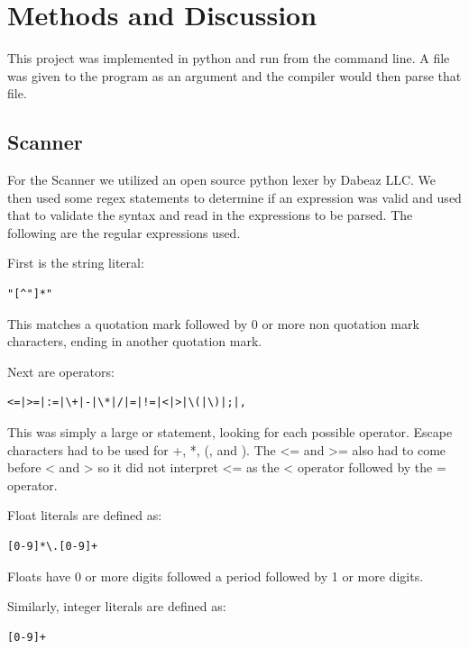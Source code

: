 \documentclass[12pt]{article}
\begin{document}
    \section{Methods and Discussion}
    
                This project was implemented in python and run from the command line.  A file was given to the program as an argument and the compiler would then parse that file.
    
        \subsection{Scanner}
                For the Scanner we utilized an open source python lexer by Dabeaz LLC.  We then used some regex statements to determine if an expression was valid and used that to validate the syntax and read in the expressions to be parsed. The following are the regular expressions used.

                First is the string literal:

                \begin{verbatim}
"[^"]*"
                \end{verbatim}

                This matches a quotation mark followed by 0 or more non quotation mark characters, ending in another quotation mark.

                Next are operators:

                \begin{verbatim}
<=|>=|:=|\+|-|\*|/|=|!=|<|>|\(|\)|;|,
                \end{verbatim}

                This was simply a large or statement, looking for each possible operator. Escape characters had to be used for +, *, (, and ). The <= and >= also had to come before < and > so it did not interpret <= as the < operator followed by the = operator.

                Float literals are defined as:

                \begin{verbatim}
[0-9]*\.[0-9]+
                \end{verbatim}

                Floats have 0 or more digits followed a period followed by 1 or more digits.

                Similarly, integer literals are defined as: 

                \begin{verbatim}
[0-9]+
                \end{verbatim}
\end{document}
